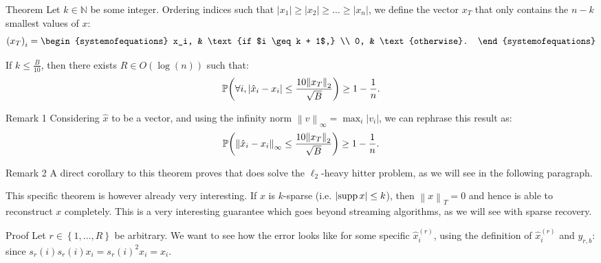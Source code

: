 \documentclass[a4paper]{article}
\begin{document}
\begin{parag}{Theorem}
    Let $k \in \mathbb{N}$ be some integer. Ordering indices such that $\left|x_1\right| \geq \left|x_2\right| \geq \ldots \geq \left|x_n\right|$, we define the vector $x_T$ that only contains the $n - k$ smallest values of $x$: 
    \[\left(x_T\right)_i = \begin{systemofequations} x_i, & \text{if $i \geq k + 1$,} \\ 0, & \text{otherwise}. \end{systemofequations}\]

    If $k \leq \frac{B}{10}$, then there exists $R \in O\left(\log\left(n\right)\right)$ such that:
    \[\prob\left(\forall i, \left|\hat{x}_i - x_i\right| \leq \frac{10\left\|x_T\right\|_2}{\sqrt{B}}\right) \geq 1 - \frac{1}{n}.\]

    \begin{subparag}{Remark 1}
        Considering $\hat{x}$ to be a vector, and using the infinity norm $\left\|v\right\|_{\infty} = \max_{i} \left|v_i\right|$, we can rephrase this result as:
        \[\prob\left(\left\|\hat{x}_i - x_i\right\|_{\infty} \leq \frac{10\left\|x_T\right\|_2}{\sqrt{B}}\right) \geq 1 - \frac{1}{n}.\]
    \end{subparag}

    \begin{subparag}{Remark 2}
        A direct corollary to this theorem proves that  does solve the $\ell_2$-heavy hitter problem, as we will see in the following paragraph.

        This specific theorem is however already very interesting. If $x$ is $k$-sparse (i.e. $\left|\supp x\right| \leq k$), then $\left\|x\right\|_T = 0$ and hence  is able to reconstruct $x$ completely. This is a very interesting guarantee which goes beyond streaming algorithms, as we will see with sparse recovery.
    \end{subparag}
    
    \begin{subparag}{Proof} 
        Let $r \in \left\{1, \ldots, R\right\}$ be arbitrary. We want to see how the error looks like for some specific $\hat{x}_i^{\left(r\right)}$, using the definition of $\hat{x}_i^{\left(r\right)}$ and $y_{r, b}$: 
        since $s_r\left(i\right) s_r\left(i\right) x_i = s_r\left(i\right)^2 x_i = x_i$.
         

\end{subparag}
\end{parag}
\end{document}
